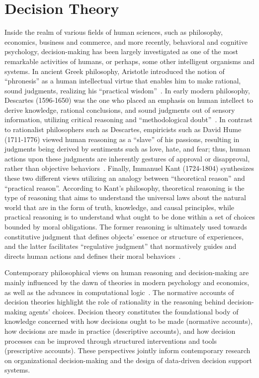 \documentclass{sfuthesis}
\begin{document}
\section{Decision Theory}
Inside the realm of various fields of human sciences, such as philosophy, economics, business and commerce, and more recently, behavioral and cognitive psychology, decision-making has been largely investigated as one of the most remarkable activities of humans, or perhaps, some other intelligent organisms and systems. In ancient Greek philosophy, Aristotle introduced the notion of “phronesis” as a human intellectual virtue that enables him to make rational, sound judgments, realizing his “practical wisdom”~\cite{bartlett_aristotles_2011}. In early modern philosophy, Descartes (1596-1650) was the one who placed an emphasis on human intellect to derive knowledge, rational conclusions, and sound judgments out of sensory information, utilizing critical reasoning and “methodological doubt”~\cite{descartes_meditations_2008}. In contrast to rationalist philosophers such as Descartes, empiricists such as David Hume (1711-1776) viewed human reasoning as a “slave” of his passions, resulting in judgments being derived by sentiments such as love, hate, and fear; thus, human actions upon these judgments are inherently gestures of approval or disapproval, rather than objective behaviors~\cite{hume_treatise_2000}. Finally, Immanuel Kant (1724-1804) synthesizes these two different views utilizing an analogy between “theoretical reason” and “practical reason”. According to Kant’s philosophy, theoretical reasoning is the type of reasoning that aims to understand the universal laws about the natural world that are in the form of truth, knowledge, and causal principles, while practical reasoning is to understand what ought to be done within a set of choices bounded by moral obligations. The former reasoning is ultimately used towards constitutive judgment that defines objects’ essence or structure of experiences, and the latter facilitates “regulative judgment” that normatively guides and directs human actions and defines their moral behaviors~\cite{de_pierris_kant_2008}.\par
Contemporary philosophical views on human reasoning and decision-making are mainly influenced by the dawn of theories in modern psychology and economics, as well as the advances in computational logic~\cite{steele_decision_2020}. The normative accounts of decision theories highlight the role of rationality in the reasoning behind decision-making agents’ choices. Decision theory constitutes the foundational body of knowledge concerned with how decisions ought to be made (normative accounts), how decisions are made in practice (descriptive accounts), and how decision processes can be improved through structured interventions and tools (prescriptive accounts). These perspectives jointly inform contemporary research on organizational decision-making and the design of data-driven decision support systems.
\end{document}
